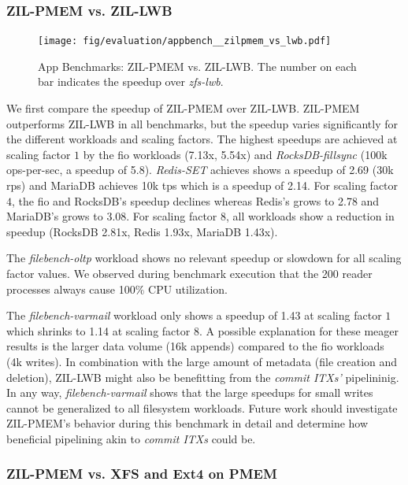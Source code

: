 \documentclass[12pt,a4paper,twoside]{book}
\begin{document}
\subsubsection{ZIL-PMEM vs. ZIL-LWB}\label{sec:eval:zilpmemvslwb}

\begin{figure}[H]
    \centering
    \texttt{[image: fig/evaluation/appbench\_\_zilpmem\_vs\_lwb.pdf]}
    \caption{App Benchmarks: ZIL-PMEM vs. ZIL-LWB. The number on each bar indicates the speedup over \textit{zfs-lwb}.}
    \label{fig:eval:appbenchmarks:zilpmem_vs_zilllwb}
\end{figure}

We first compare the speedup of ZIL-PMEM over ZIL-LWB.
ZIL-PMEM outperforms ZIL-LWB in all benchmarks, but the speedup varies significantly for the different workloads and scaling factors.
The highest speedups are achieved at scaling factor $1$ by the fio workloads (7.13x, 5.54x) and \textit{RocksDB-fillsync} (100k ops-per-sec, a speedup of 5.8).
\textit{Redis-SET} achieves shows a speedup of 2.69 (30k rps) and MariaDB achieves 10k tps which is a speedup of 2.14.
For scaling factor $4$, the fio and RocksDB's speedup declines whereas Redis's grows to 2.78 and MariaDB's grows to 3.08.
For scaling factor $8$, all workloads show a reduction in speedup (RocksDB 2.81x, Redis 1.93x, MariaDB 1.43x).

The \textit{filebench-oltp} workload shows no relevant speedup or slowdown for all scaling factor values.
We observed during benchmark execution that the 200 reader processes always cause 100\% CPU utilization.

The \textit{filebench-varmail} workload only shows a speedup of 1.43 at scaling factor $1$ which shrinks to 1.14 at scaling factor $8$.
A possible explanation for these meager results is the larger data volume (16k appends) compared to the fio workloads (4k writes).
In combination with the large amount of metadata (file creation and deletion), ZIL-LWB might also be benefitting from the \textit{commit ITXs'} pipelininig.
In any way, \textit{filebench-varmail} shows that the large speedups for small writes cannot be generalized to all filesystem workloads.
Future work should investigate ZIL-PMEM's behavior during this benchmark in detail and determine how beneficial pipelining akin to \textit{commit ITXs} could be.

\subsubsection{ZIL-PMEM vs. XFS and Ext4 on PMEM}
\end{document}
